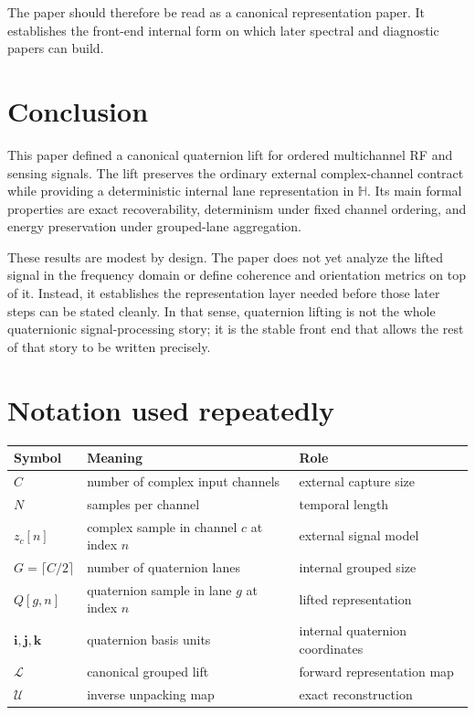 \documentclass[11pt]{article}
\theoremstyle{remark}
\newcommand{\HH}{\mathbb{H}}
\newcommand{\ii}{\mathbf{i}}
\newcommand{\jj}{\mathbf{j}}
\newcommand{\kk}{\mathbf{k}}
\newcommand{\lift}{\mathcal{L}}
\newcommand{\unpack}{\mathcal{U}}
\begin{document}
The paper should therefore be read as a canonical representation paper. It establishes the front-end internal form on which later spectral and diagnostic papers can build.

\section{Conclusion}

This paper defined a canonical quaternion lift for ordered multichannel RF and sensing signals. The lift preserves the ordinary external complex-channel contract while providing a deterministic internal lane representation in \(\HH\). Its main formal properties are exact recoverability, determinism under fixed channel ordering, and energy preservation under grouped-lane aggregation.

These results are modest by design. The paper does not yet analyze the lifted signal in the frequency domain or define coherence and orientation metrics on top of it. Instead, it establishes the representation layer needed before those later steps can be stated cleanly. In that sense, quaternion lifting is not the whole quaternionic signal-processing story; it is the stable front end that allows the rest of that story to be written precisely.

\appendix

\section{Notation used repeatedly}

\begin{center}
\begin{tabular}{@{}lll@{}}
\toprule
Symbol & Meaning & Role \\
\midrule
\(C\) & number of complex input channels & external capture size \\
\(N\) & samples per channel & temporal length \\
\(z_c[n]\) & complex sample in channel \(c\) at index \(n\) & external signal model \\
\(G=\lceil C/2\rceil\) & number of quaternion lanes & internal grouped size \\
\(Q[g,n]\) & quaternion sample in lane \(g\) at index \(n\) & lifted representation \\
\(\ii,\jj,\kk\) & quaternion basis units & internal quaternion coordinates \\
\(\lift\) & canonical grouped lift & forward representation map \\
\(\unpack\) & inverse unpacking map & exact reconstruction \\
\bottomrule
\end{tabular}
\end{center}
\end{document}
